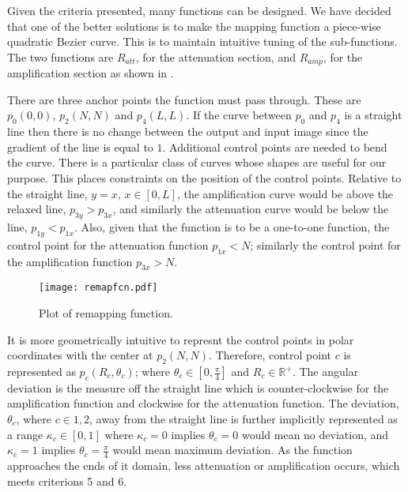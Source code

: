 \begin{definition}
	Given the criteria presented, many functions can be designed. We have decided that one of the better solutions is to make the mapping function a piece-wise quadratic Bezier curve. This is to maintain intuitive tuning of the sub-functions. The two functions are $R_{att}$, for the attenuation section, and $R_{amp}$, for the amplification section as shown in .
	
	There are three anchor points the function must pass through. These are $p_0(0,0)$, $p_2(N, N)$ and $p_4(L,L)$. If the curve between $p_0$ and $p_4$ is a straight line then there is no change between the output and input image since the gradient of the line is equal to $1$. Additional control points are needed to bend the curve.
	There is a particular class of curves whose shapes are useful for our purpose. This places constraints on the position of the control points. Relative to the straight line, $y=x, \, x \in [0,L]$, the amplification curve would be above the relaxed line, $p_{3y} > p_{3x}$, and similarly the attenuation curve would be below the line, $p_{1y} < p_{1x}$. Also, given that the function is to be a one-to-one function, the control point for the attenuation function $p_{1x}<N$; similarly the control point for the amplification function $p_{3x}>N$.
	
	\begin{figure}[!h]
		\centering
		\texttt{[image: remapfcn.pdf]}
		\caption{Plot of remapping function.}
		\label{fig:remapfcn}
	\end{figure}
	
	It is more geometrically intuitive to represnt the control points in polar coordinates with the center at $p_2(N,N)$. Therefore, control point $c$ is represented as $p_c(R_c, \theta_c)$; where $\theta_c \in [0, \frac{\pi}{4}]$ and $R_c \in \mathbb{R}^+$. The angular deviation is the measure off the straight line which is counter-clockwise for the amplification function and clockwise for the attenuation function. The deviation, $\theta_c$, where $c \in {1,2}$, away from the straight line is further implicitly represented as a range $\kappa_c \in [0,1]$ where $\kappa_c=0$ implies $\theta_c = 0$ would mean no deviation, and $\kappa_c = 1$ implies $\theta_c = \frac{\pi}{4}$ would mean maximum deviation.
	As the function approaches the ends of it domain, less attenuation or amplification occurs, which meets criterions 5 and 6.
	
	\begin{figure}[!t]
		\centering
\end{figure}
\end{definition}

